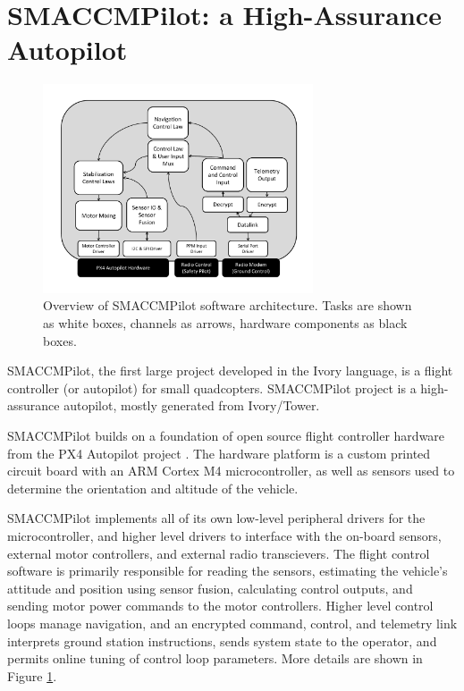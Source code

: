 \section{SMACCMPilot: a High-Assurance Autopilot}
\label{sec:smaccmpilot}

\begin{figure}
  \begin{center}
\includegraphics[width=8cm]{figures/smaccmpilot-diagram-jan14}
  \end{center}
\caption[SMACCMPilot software architecture]{Overview of SMACCMPilot
software architecture. Tasks are shown as white boxes, channels as arrows,
hardware components as black boxes.}
\label{fig:smaccmpilotSwArch}
\end{figure}


SMACCMPilot, the first large project
developed in the Ivory language, is a flight controller (or autopilot) for small
quadcopters. SMACCMPilot project is a high-assurance autopilot, mostly generated
from Ivory/Tower.

SMACCMPilot builds on a foundation of open source flight controller hardware
from the PX4 Autopilot project . The hardware platform is a
custom printed circuit board with an ARM Cortex M4 microcontroller, as well as
sensors used to determine the orientation and altitude of the vehicle.

SMACCMPilot implements all of its own low-level peripheral drivers for the
microcontroller, and higher level drivers to interface with the on-board
sensors, external motor controllers, and external radio transcievers. The flight
control software is primarily responsible for reading the sensors, estimating
the vehicle's attitude and position using sensor fusion, calculating control
outputs, and sending motor power commands to the motor controllers.  Higher
level control loops manage navigation, and an encrypted command, control, and
telemetry link interprets ground station instructions, sends system state to the
operator, and permits online tuning of control loop parameters. More details are
shown in Figure \ref{fig:smaccmpilotSwArch}.

